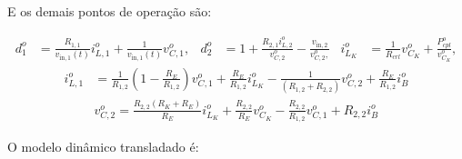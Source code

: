 E os demais pontos de operação são:

\begin{align}
  d_1^o     & = \frac{R_{1,1}}{v_{\text{in}, 1}(t)} i_{L,1}^o + \frac{1}{v_{\text{in}, 1}(t)} v_{C,1}^o, &
  d_2^o     & = 1 + \frac{R_{2,1}i_{L,2}^o}{v_{C,2}^o} - \frac{v_{\text{in},2}}{v_{C,2}^o,}            &
  i_{L_K}^o & = \frac{1}{R_{crl}} v_{C_K}^o + \frac{P_{cpl}^o}{v_{C_K}^o},
\end{align}
\begin{align}
  i_{L,1}^o & = \frac{1}{R_{1,2}} \left(1 - \frac{R_E}{{R_{1,2}}}\right) v_{C,1}^o + \frac{R_E}{R_{1,2} } i_{L_K}^o - \frac{1}{ (R_{1,2} + R_{2,2})} v_{C,2}^o + \frac{R_E}{R_{1,2}} i_B^o \\[12pt]
            & v_{C,2}^o = \frac{R_{2,2}(R_K + R_E)}{R_E} i_{L_K}^o + \frac{R_{2,2}}{R_E} v_{C_K}^o - \frac{R_{2,2}}{{R_{1,2}}} v_{C,1}^o + R_{2,2}i_B^o
\end{align}


O modelo dinâmico transladado é:


